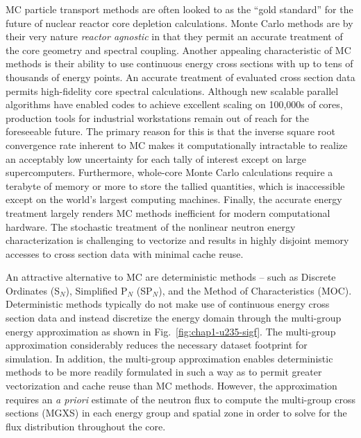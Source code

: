 
\ac{MC} particle transport methods are often looked to as the ``gold standard'' for the future of nuclear reactor core depletion calculations. Monte Carlo methods are by their very nature \textit{reactor agnostic} in that they permit an accurate treatment of the core geometry and spectral coupling. Another appealing characteristic of \ac{MC} methods is their ability to use continuous energy cross sections with up to tens of thousands of energy points. An accurate treatment of evaluated cross section data permits high-fidelity core spectral calculations. Although new scalable parallel algorithms have enabled codes to achieve excellent scaling on 100,000s of cores, production tools for industrial workstations remain out of reach for the foreseeable future. The primary reason for this is that the inverse square root convergence rate inherent to \ac{MC} makes it computationally intractable to realize an acceptably low uncertainty for each tally of interest except on large supercomputers. Furthermore, whole-core Monte Carlo calculations require a terabyte of memory or more to store the tallied quantities, which is inaccessible except on the world's largest computing machines. Finally, the accurate energy treatment largely renders \ac{MC} methods inefficient for modern computational hardware. The stochastic treatment of the nonlinear neutron energy characterization is challenging to vectorize and results in highly disjoint memory accesses to cross section data with minimal cache reuse. 

An attractive alternative to MC are deterministic methods -- such as Discrete Ordinates (S$_N$), Simplified P$_N$ (SP$_N$), and the Method of Characteristics (MOC). Deterministic methods typically do not make use of continuous energy cross section data and instead discretize the energy domain through the multi-group energy approximation as shown in Fig.~\ref{fig:chap1-u235-sigf}. The multi-group approximation considerably reduces the necessary dataset footprint for simulation. In addition, the multi-group approximation enables deterministic methods to be more readily formulated in such a way as to permit greater vectorization and cache reuse than \ac{MC} methods. However, the approximation requires an \textit{a priori} estimate of the neutron flux to compute the multi-group cross sections (MGXS) in each energy group and spatial zone in order to solve for the flux distribution throughout the core.


